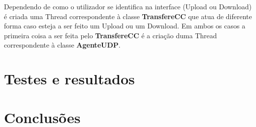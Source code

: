 \documentclass{llncs}
\begin{document}
Dependendo de como o utilizador se identifica na interface (Upload ou Download) é criada uma Thread correspondente à classe \textbf{TransfereCC} que atua de diferente forma caso esteja a ser feito um Upload ou um Download. Em ambos os casos a primeira coisa a ser feita pelo \textbf{TransfereCC} é a criação duma Thread correspondente à classe \textbf{AgenteUDP}.





\section{Testes e resultados}



\section{Conclusões}
\end{document}
